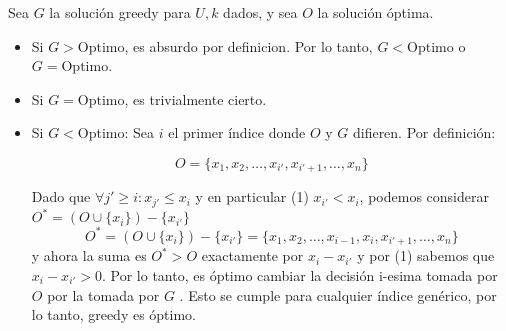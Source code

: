 \documentclass{article}
\begin{document}
Sea \(G\) la solución greedy para \( U, k \) dados, y sea \( O \) la solución óptima.

\begin{itemize}
    \item Si \( G > \text{Optimo} \), es absurdo por definicion. Por lo tanto, \( G < \text{Optimo} \) o \( G = \text{Optimo} \).
    
    \item Si \( G = \text{Optimo} \), es trivialmente cierto.
    
    \item Si \( G < \text{Optimo} \): Sea \( i \) el primer índice donde \( O \) y \( G \) difieren. Por definición:
    
    \[ O = \{x_1, x_2, \dots, x_{i'}, x_{i' + 1}, \dots, x_n\} \]
    
    Dado que \( \forall {j'} \geq i: x_{j'} \leq x_i \) y  en particular (1) \( x_{i'} < x_i \), podemos considerar \( O^* = (O \cup \{x_i\}) - \{x_{i'}\} \)
		 \[ O^* = (O \cup \{x_i\}) - \{x_{i'}\} = \{x_1, x_2, \dots, x_{i-1}, x_i, x_{i' + 1}, \dots, x_n\} \]    
     y ahora la suma es \(  O^* >  O \) exactamente por \( x_i - x_{i'} \) y por (1) sabemos que \( x_i - x_{i'} > 0 \). Por lo tanto, es óptimo cambiar la decisión  i-esima tomada por \( O \) por la tomada por \( G \) . Esto se cumple para cualquier índice genérico, por lo tanto, greedy es óptimo.
    
    
\end{itemize}
\end{document}
